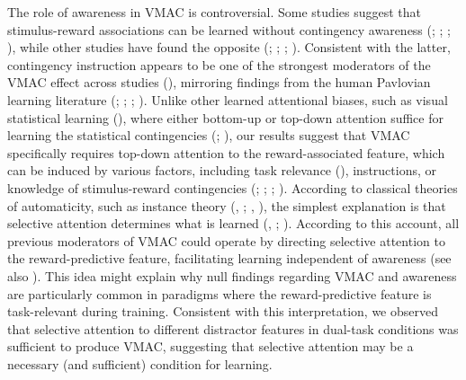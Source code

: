 \documentclass[
  jou,
  floatsintext,
  longtable,
  nolmodern,
  notxfonts,
  notimes,
  colorlinks=true,linkcolor=blue,citecolor=blue,urlcolor=blue]{apa7}
\begin{document}
The role of awareness in VMAC is controversial. Some studies suggest
that stimulus-reward associations can be learned without contingency
awareness (;
;
;
), while other
studies have found the opposite (; ; ; ). Consistent with
the latter, contingency instruction appears to be one of the strongest
moderators of the VMAC effect across studies
(), mirroring findings from the human Pavlovian learning literature
(;
;
;
). Unlike other
learned attentional biases, such as visual statistical learning
(), where either
bottom-up or top-down attention suffice for learning the statistical
contingencies (;
), our results
suggest that VMAC specifically requires top-down attention to the
reward-associated feature, which can be induced by various factors,
including task relevance (), instructions, or knowledge of stimulus-reward contingencies
(;
;
;
). According to classical
theories of automaticity, such as instance theory
(,
; , ), the simplest explanation is that
selective attention determines what is learned
(,
; ). According to this account, all previous moderators of
VMAC could operate by directing selective attention to the
reward-predictive feature, facilitating learning independent of
awareness (see also ). This idea might explain why null findings regarding VMAC and
awareness are particularly common in paradigms where the
reward-predictive feature is task-relevant during training. Consistent
with this interpretation, we observed that selective attention to
different distractor features in dual-task conditions was sufficient to
produce VMAC, suggesting that selective attention may be a necessary
(and sufficient) condition for learning.
\end{document}

